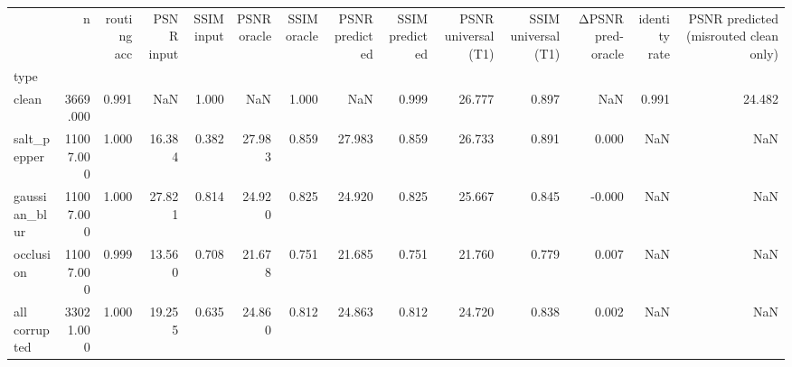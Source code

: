\begin{tabular}{lrrrrrrrrrrrrr}
\toprule
 & n & routing acc & PSNR input & SSIM input & PSNR oracle & SSIM oracle & PSNR predicted & SSIM predicted & PSNR universal (T1) & SSIM universal (T1) & ΔPSNR pred-oracle & identity rate & PSNR predicted (misrouted clean only) \\
type &  &  &  &  &  &  &  &  &  &  &  &  &  \\
\midrule
clean & 3669.000 & 0.991 & NaN & 1.000 & NaN & 1.000 & NaN & 0.999 & 26.777 & 0.897 & NaN & 0.991 & 24.482 \\
salt_pepper & 11007.000 & 1.000 & 16.384 & 0.382 & 27.983 & 0.859 & 27.983 & 0.859 & 26.733 & 0.891 & 0.000 & NaN & NaN \\
gaussian_blur & 11007.000 & 1.000 & 27.821 & 0.814 & 24.920 & 0.825 & 24.920 & 0.825 & 25.667 & 0.845 & -0.000 & NaN & NaN \\
occlusion & 11007.000 & 0.999 & 13.560 & 0.708 & 21.678 & 0.751 & 21.685 & 0.751 & 21.760 & 0.779 & 0.007 & NaN & NaN \\
all corrupted & 33021.000 & 1.000 & 19.255 & 0.635 & 24.860 & 0.812 & 24.863 & 0.812 & 24.720 & 0.838 & 0.002 & NaN & NaN \\
\bottomrule
\end{tabular}
